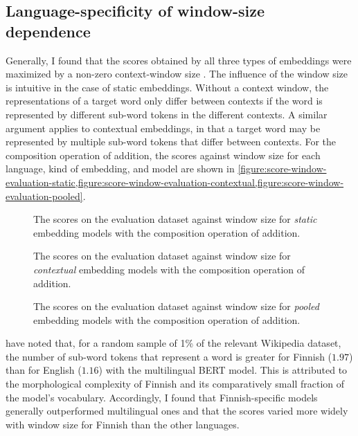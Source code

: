 \subsection{Language-specificity of window-size dependence}
\label{sec:language-specificity}

Generally, I found that the scores obtained by all three types of embeddings were
maximized by a non-zero context-window size
.
The influence of the window size is intuitive in the case of static embeddings.
Without a context window, the representations of a target word only differ between
contexts if the word is represented by different sub-word tokens in the different
contexts.
A similar argument applies to contextual embeddings, in that a target word may be
represented by multiple sub-word tokens that differ between contexts.
For the composition operation of addition, the scores against window size for each
language, kind of embedding, and model are shown in
\cref{figure:score-window-evaluation-static,figure:score-window-evaluation-contextual,figure:score-window-evaluation-pooled}.



\begin{figure}
  \centering
  
  \caption{The scores on the evaluation dataset against window size for \emph{static}
    embedding models with the composition operation of addition.}
  \label{figure:score-window-evaluation-static}
\end{figure}

\begin{figure}
  \centering
  
  \caption{The scores on the evaluation dataset against window size for
    \emph{contextual} embedding models with the composition operation of addition.}
  \label{figure:score-window-evaluation-contextual}
\end{figure}

\begin{figure}
  \centering
  
  \caption{The scores on the evaluation dataset against window size for \emph{pooled}
    embedding models with the composition operation of addition.}
  \label{figure:score-window-evaluation-pooled}
\end{figure}

\textcites[3]{Virtanen2019} have noted that, for a random sample of 1\% of the relevant
Wikipedia dataset, the number of sub-word tokens that represent a word
is greater for Finnish ($1.97$) than for English ($1.16$) with the multilingual BERT model.
This is attributed to the morphological complexity of Finnish and its comparatively
small fraction of the model's vocabulary.
Accordingly, I found that Finnish-specific models generally outperformed multilingual
ones and that the scores varied more widely with window size for Finnish than the other
languages.
